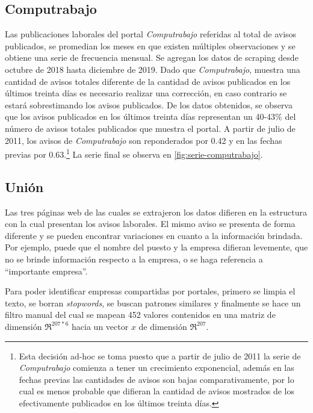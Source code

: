 \documentclass[12pt,oneside]{reedthesis}
\begin{document}
\hypertarget{computrabajo}{%
\subsection{Computrabajo}\label{computrabajo}}

Las publicaciones laborales del portal \emph{Computrabajo} referidas al total de avisos publicados, se promedian los meses en que existen múltiples observaciones y se obtiene una serie de frecuencia mensual. Se agregan los datos de scraping desde octubre de 2018 hasta diciembre de 2019. Dado que \emph{Computrabajo}, muestra una cantidad de avisos totales diferente de la cantidad de avisos publicados en los últimos treinta días es necesario realizar una corrección, en caso contrario se estará sobrestimando los avisos publicados. De los datos obtenidos, se observa que los avisos publicados en los últimos treinta días representan un 40-43\% del número de avisos totales publicados que muestra el portal. A partir de julio de 2011, los avisos de \emph{Computrabajo} son reponderados por 0.42 y en las fechas previas por 0.63.\footnote{Esta decisión ad-hoc se toma puesto que a partir de julio de 2011 la serie de \emph{Computrabajo} comienza a tener un crecimiento exponencial, además en las fechas previas las cantidades de avisos son bajas comparativamente, por lo cual es menos probable que difieran la cantidad de avisos mostrados de los efectivamente publicados en los últimos treinta días.} La serie final se observa en \ref{fig:serie-computrabajo}.

\hypertarget{uniuxf3n}{%
\subsection{Unión}\label{uniuxf3n}}

Las tres páginas web de las cuales se extrajeron los datos difieren en la estructura con la cual presentan los avisos laborales. El mismo aviso se presenta de forma diferente y se pueden encontrar variaciones en cuanto a la información brindada. Por ejemplo, puede que el nombre del puesto y la empresa difieran levemente, que no se brinde información respecto a la empresa, o se haga referencia a ``importante empresa''.

Para poder identificar empresas compartidas por portales, primero se limpia el texto, se borran \emph{stopwords}, se buscan patrones similares y finalmente se hace un filtro manual del cual se mapean 452 valores contenidos en una matriz de dimensión \(\Re^{207*6}\) hacia un vector \(x\) de dimensión \(\Re^{207}\).
\end{document}
